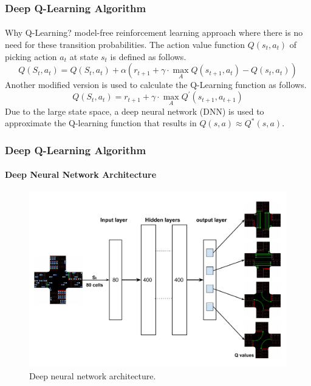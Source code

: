 \documentclass[aspectratio=169]{beamer}
\begin{document}
\begin{frame}
\frametitle{Deep Q-Learning Algorithm}
\framesubtitle{}

Why Q-Learning? model-free reinforcement learning approach where there is no need for these transition probabilities. The action value function $Q\left(s_t, a_t\right)$ of picking action $a_t$ at state $s_t$ is defined as follows.
\begin{equation}
   Q(S_{t},a_{t})= Q(S_{t},a_{t})+\alpha(r_{t+1}+\gamma \cdot \max_{A}Q(s_{t+1},a_{t})-Q(s_{t},a_{t}))
\end{equation}
Another modified version is used to calculate the Q-Learning function as follows.
\begin{equation}
   \label{Eq:10}
   Q(S_{t},a_{t})= r_{t+1}+\gamma \cdot \max_{A}Q^{\prime}(s_{t+1},a_{t+1})
\end{equation}
Due to the large state space, a deep neural network (DNN) is used to approximate the Q-learning function that results in $Q(s, a) \approx Q^*(s, a)$.
\end{frame}

\begin{frame}
\frametitle{Deep Q-Learning Algorithm}
\framesubtitle{Deep Neural Network Architecture}

\begin{figure}
    \centering
    \includegraphics[width=0.62\linewidth]{images/DNN.pdf}
    \caption{Deep neural network architecture.}
\end{figure}

\end{frame}
\end{document}
